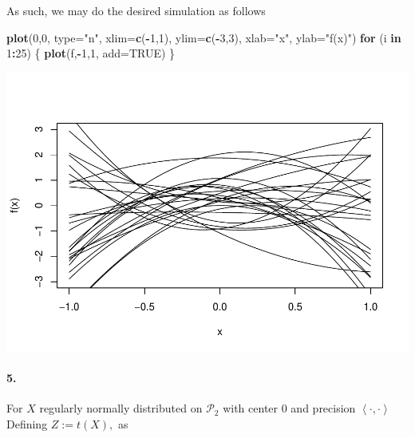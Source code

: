 \documentclass[
]{article}
\newenvironment{Shaded}{\begin{snugshade}}{\end{snugshade}}
\newcommand{\ControlFlowTok}[1]{\textcolor[rgb]{0.13,0.29,0.53}{\textbf{#1}}}
\newcommand{\DataTypeTok}[1]{\textcolor[rgb]{0.13,0.29,0.53}{#1}}
\newcommand{\DecValTok}[1]{\textcolor[rgb]{0.00,0.00,0.81}{#1}}
\newcommand{\KeywordTok}[1]{\textcolor[rgb]{0.13,0.29,0.53}{\textbf{#1}}}
\newcommand{\NormalTok}[1]{#1}
\newcommand{\OperatorTok}[1]{\textcolor[rgb]{0.81,0.36,0.00}{\textbf{#1}}}
\newcommand{\OtherTok}[1]{\textcolor[rgb]{0.56,0.35,0.01}{#1}}
\newcommand{\StringTok}[1]{\textcolor[rgb]{0.31,0.60,0.02}{#1}}
\begin{document}
As such, we may do the desired simulation as follows

\begin{Shaded}
\begin{Highlighting}[]
\KeywordTok{plot}\NormalTok{(}\DecValTok{0}\NormalTok{,}\DecValTok{0}\NormalTok{, }\DataTypeTok{type=}\StringTok{"n"}\NormalTok{, }\DataTypeTok{xlim=}\KeywordTok{c}\NormalTok{(}\OperatorTok{-}\DecValTok{1}\NormalTok{,}\DecValTok{1}\NormalTok{), }\DataTypeTok{ylim=}\KeywordTok{c}\NormalTok{(}\OperatorTok{-}\DecValTok{3}\NormalTok{,}\DecValTok{3}\NormalTok{), }\DataTypeTok{xlab=}\StringTok{"x"}\NormalTok{, }\DataTypeTok{ylab=}\StringTok{"f(x)"}\NormalTok{)}
\ControlFlowTok{for}\NormalTok{ (i }\ControlFlowTok{in} \DecValTok{1}\OperatorTok{:}\DecValTok{25}\NormalTok{) \{}
\KeywordTok{plot}\NormalTok{(f,}\OperatorTok{-}\DecValTok{1}\NormalTok{,}\DecValTok{1}\NormalTok{, }\DataTypeTok{add=}\OtherTok{TRUE}\NormalTok{) \}}
\end{Highlighting}
\end{Shaded}

\begin{center}\includegraphics{matstatproblems20-21_files/figure-latex/unnamed-chunk-41-1} \end{center}

\hypertarget{section-34}{%
\paragraph{\texorpdfstring{\textbf{5.}}{5.}}\label{section-34}}

For \(X\) regularly normally distributed on \(\mathscr{P}_2\) with
center \(0\) and precision \(\left\langle \cdot, \cdot \right\rangle\)
Defining \(Z:=t(X),\) as
\end{document}
